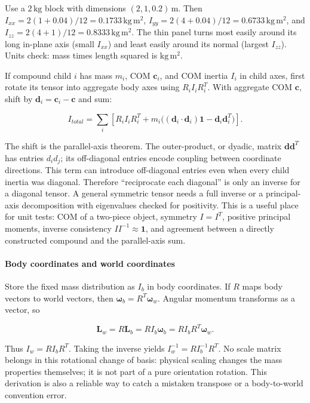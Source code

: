 Use a \(2\,\mathrm{kg}\) block with dimensions \((2,1,0.2)\,\mathrm m\). Then \(I_{xx}=2(1+0.04)/12=0.1733\,\mathrm{kg\,m^2}\), \(I_{yy}=2(4+0.04)/12=0.6733\,\mathrm{kg\,m^2}\), and \(I_{zz}=2(4+1)/12=0.8333\,\mathrm{kg\,m^2}\). The thin panel turns most easily around its long in-plane axis (small \(I_{xx}\)) and least easily around its normal (largest \(I_{zz}\)). Units check: mass times length squared is \(\mathrm{kg\,m^2}\).

If compound child \(i\) has mass \(m_i\), COM \(\mathbf c_i\), and COM inertia \(I_i\) in child axes, first rotate its tensor into aggregate body axes using \(R_iI_iR_i^T\). With aggregate COM \(\mathbf c\), shift by \(\mathbf d_i=\mathbf c_i-\mathbf c\) and sum:

\[
I_{total}=\sum_i\left[R_iI_iR_i^T+m_i\big((\mathbf d_i\cdot\mathbf d_i)\mathbf 1-\mathbf d_i\mathbf d_i^T\big)\right].
\]

The shift is the parallel-axis theorem. The outer-product, or dyadic, matrix \(\mathbf d\mathbf d^T\) has entries \(d_i d_j\); its off-diagonal entries encode coupling between coordinate directions. This term can introduce off-diagonal entries even when every child inertia was diagonal. Therefore ``reciprocate each diagonal'' is only an inverse for a diagonal tensor. A general symmetric tensor needs a full inverse or a principal-axis decomposition with eigenvalues checked for positivity. This is a useful place for unit tests: COM of a two-piece object, symmetry \(I=I^T\), positive principal moments, inverse consistency \(II^{-1}\approx\mathbf1\), and agreement between a directly constructed compound and the parallel-axis sum.

\paragraph{Body coordinates and world coordinates}\label{body-coordinates-and-world-coordinates}

Store the fixed mass distribution as \(I_b\) in body coordinates. If \(R\) maps body vectors to world vectors, then \(\boldsymbol\omega_b=R^T\boldsymbol\omega_w\). Angular momentum transforms as a vector, so

\[
\mathbf L_w=R\mathbf L_b=RI_b\boldsymbol\omega_b=RI_bR^T\boldsymbol\omega_w.
\]

Thus \(I_w=RI_bR^T\). Taking the inverse yields \(I_w^{-1}=RI_b^{-1}R^T\). No scale matrix belongs in this rotational change of basis: physical scaling changes the mass properties themselves; it is not part of a pure orientation rotation. This derivation is also a reliable way to catch a mistaken transpose or a body-to-world convention error.

